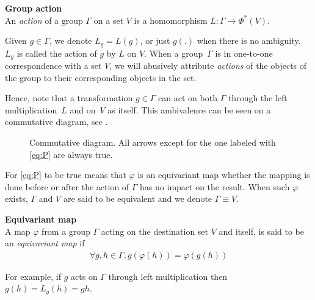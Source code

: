 \begin{definition}\textbf{Group action}\\
An \emph{action} of a group $\Gamma$ on a set $V$ is a homomorphism $L: \Gamma \to \Phi^*(V)$.
\end{definition}

\begin{remark}
Given $g \in \Gamma$, we denote $L_g = L(g)$, or just $g(.)$ when there is no ambiguity. $L_g$ is called the action of $g$ by $L$ on $V$. When a group~$\Gamma$ is in one-to-one correspondence with a set $V$, we will abusively attribute \emph{actions} of the objects of the group to their corresponding objects in the set.
\end{remark}

Hence, note that a transformation $g \in \Gamma$ can act on both $\Gamma$ through the left multiplication~$L$ and on~$V$ as itself. This ambivalence can be seen on a commutative diagram, see .%

\begin{figure}[H]
\centering
{}
\caption{Commutative diagram. All arrows except for the one labeled with \eqref{eq:P} are always true.}
\label{fig:com}
\end{figure}

For \eqref{eq:P} to be true means that $\varphi$ is an equivariant map \ie whether the mapping is done before or after the action of $\Gamma$ has no impact on the result. When such $\varphi$ exists, $\Gamma$ and $V$ are said to be equivalent and we denote $\Gamma \equiv V$.

\begin{definition}\textbf{Equivariant map}\\
A map $\varphi$ from a group $\Gamma$ acting on the destination set $V$ and itself, is said to be an \emph{equivariant map} if
\begin{gather*}
\forall g, h \in \Gamma, g(\varphi(h)) = \varphi(g(h))
\end{gather*}
\label{def:eqmap}
\end{definition}
\begin{remark} For example, if $g$ acts on $\Gamma$ through left multiplication then $g(h) = L_g(h) = gh$.
\end{remark}

